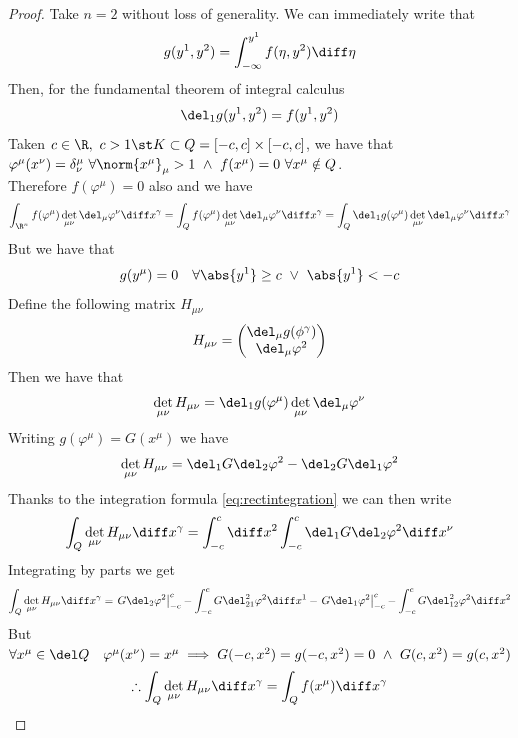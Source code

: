\documentclass[../mmf.tex]{subfiles}
\begin{document}
\begin{proof}
	Take $n=2$ without loss of generality. We can immediately write that
	\begin{equation*}
		g(y^1,y^2)=\int_{-\infty}^{y^1}f(\eta,y^2)\diff\eta
	\end{equation*}
	Then, for the fundamental theorem of integral calculus
	\begin{equation*}
		\del_1g(y^1,y^2)=f(y^1,y^2)
	\end{equation*}
	Taken $c\in\R,\ c>1\st K\subset Q=[-c,c]\times[-c,c]$, we have that $\varphi^\mu(x^\nu)=\delta^\mu_\nu\ \forall\norm{x^\mu}_\mu>1\ \wedge\ f(x^\mu)=0\ \forall x^\mu\notin Q$.\\
	Therefore $f(\varphi^\mu)=0$ also and we have
	\begin{equation*}
		\int_{\R^n}^{}f(\varphi^\mu)\det_{\mu\nu}\del_\mu\varphi^\nu\diff x^\gamma=\int_{Q}^{}f(\varphi^\mu)\det_{\mu\nu}\del_\mu\varphi^\nu\diff x^\gamma=\int_{Q}^{}\del_1g(\varphi^\mu)\det_{\mu\nu}\del_\mu\varphi^\nu\diff x^\gamma
	\end{equation*}
	But we have that
	\begin{equation*}
		g(y^\mu)=0\quad\forall\abs{y^1}\ge c\ \vee\ \abs{y^1}<-c
	\end{equation*}
	Define the following matrix $H_{\mu\nu}$
	\begin{equation*}
		H_{\mu\nu}=\begin{pmatrix}\del_\mu g(\phi^\gamma)\\\del_\mu\varphi^2\end{pmatrix}
	\end{equation*}
	Then we have that
	\begin{equation*}
		\det_{\mu\nu}H_{\mu\nu}=\del_1g(\varphi^\mu)\det_{\mu\nu}\del_{\mu}\varphi^\nu
	\end{equation*}
	Writing $g(\varphi^\mu)=G(x^\mu)$ we have
	\begin{equation*}
		\det_{\mu\nu}H_{\mu\nu}=\del_1G\del_2\varphi^2-\del_2G\del_1\varphi^2
	\end{equation*}
	Thanks to the integration formula \eqref{eq:rectintegration} we can then write
	\begin{equation*}
		\int_{Q}^{}\det_{\mu\nu}H_{\mu\nu}\diff x^\gamma=\int_{-c}^{c}\diff x^2\int_{-c}^{c}\del_1G\del_2\varphi^2\diff x^\nu
	\end{equation*}
	Integrating by parts we get
	\begin{equation*}
		\int_{Q}^{}\det_{\mu\nu}H_{\mu\nu}\diff x^\gamma=\left.G\del_2\varphi^2\right|^c_{-c}-\int_{-c}^{c}G\del_{21}^2\varphi^2\diff x^1-\left.G\del_1\varphi^2\right|^c_{-c}-\int_{-c}^{c}G\del_{12}^2\varphi^2\diff x^2
	\end{equation*}
	But $\forall x^\mu\in\del Q\quad\varphi^\mu(x^\nu)=x^\mu\implies{} G(-c,x^2)=g(-c,x^2)=0\ \wedge\ G(c,x^2)=g(c,x^2)$
	\begin{equation*}
		\therefore\int_{Q}^{}\det_{\mu\nu}H_{\mu\nu}\diff x^\gamma=\int_{Q}^{}f(x^\mu)\diff x^\gamma
	\end{equation*}
\end{proof}
\end{document}
